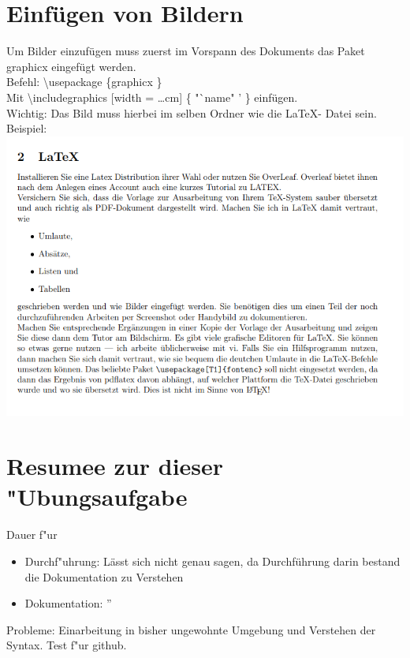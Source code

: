 \documentclass[a4paper,11pt,titlepage]{article}
\begin{document}
\section{Einfügen von Bildern}
Um Bilder einzufügen muss zuerst im Vorspann des Dokuments das Paket graphicx eingefügt werden.\\
Befehl: \textbackslash usepackage \{graphicx \} \\
Mit \textbackslash includegraphics [width = \dots cm] \{ "`name" ' \} einfügen. \\
Wichtig: Das Bild muss hierbei im selben Ordner wie die LaTeX- Datei sein.
\\
Beispiel: \newpage
\includegraphics [width = 10 cm] {Aufgabe} \\

\section{Resumee zur dieser "Ubungsaufgabe}
Dauer f"ur 
\begin{itemize}
	\item Durchf"uhrung: Lässt sich nicht genau sagen, da Durchführung darin bestand die Dokumentation zu Verstehen
	\item Dokumentation: ''
\end{itemize}
Probleme: Einarbeitung in bisher ungewohnte Umgebung und Verstehen der Syntax.
Test f"ur github.
\end{document}
